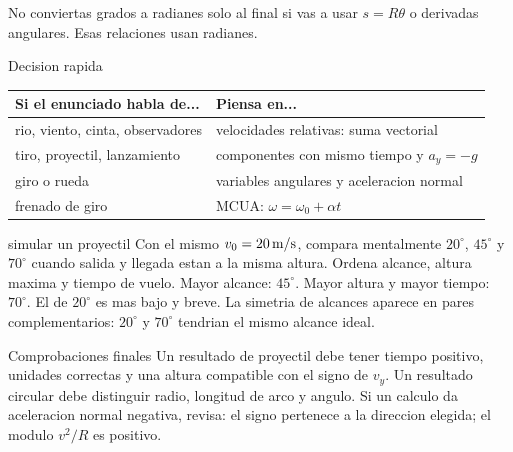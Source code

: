 \documentclass[10pt,a4paper]{article}
\begin{document}
\begin{warnbox}
No conviertas grados a radianes solo al final si vas a usar $s=R\theta$ o derivadas angulares. Esas relaciones usan radianes.
\end{warnbox}

\clearpage

\begin{lessoncard}{Decision rapida}
\begin{tabularx}{\linewidth}{@{}p{2.7cm}Y@{}}
\toprule
Si el enunciado habla de... & Piensa en...\\
\midrule
rio, viento, cinta, observadores & velocidades relativas: suma vectorial\\
tiro, proyectil, lanzamiento & componentes con mismo tiempo y $a_y=-g$\\
giro o rueda & variables angulares y aceleracion normal\\
frenado de giro & MCUA: $\omega=\omega_0+\alpha t$\\
\bottomrule
\end{tabularx}
\end{lessoncard}

\begin{exercisebox}{simular un proyectil}
Con el mismo $v_0=20\,\mathrm{m/s}$, compara mentalmente $20^\circ$, $45^\circ$ y $70^\circ$ cuando salida y llegada estan a la misma altura. Ordena alcance, altura maxima y tiempo de vuelo.
\solutionblock Mayor alcance: $45^\circ$. Mayor altura y mayor tiempo: $70^\circ$. El de $20^\circ$ es mas bajo y breve. La simetria de alcances aparece en pares complementarios: $20^\circ$ y $70^\circ$ tendrian el mismo alcance ideal.
\end{exercisebox}

\begin{lessoncard}{Comprobaciones finales}
Un resultado de proyectil debe tener tiempo positivo, unidades correctas y una altura compatible con el signo de $v_y$. Un resultado circular debe distinguir radio, longitud de arco y angulo. Si un calculo da aceleracion normal negativa, revisa: el signo pertenece a la direccion elegida; el modulo $v^2/R$ es positivo.
\end{lessoncard}
\end{document}
